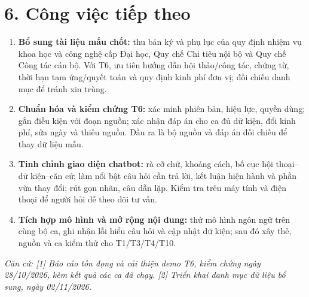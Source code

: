 \documentclass[12pt,a4paper]{article}
\begin{document}
\section*{6. Công việc tiếp theo}
\begin{enumerate}
\item \textbf{Bổ sung tài liệu mấu chốt:} thu bản ký và phụ lục của quy định nhiệm vụ khoa học và công nghệ cấp Đại học, Quy chế Chi tiêu nội bộ và Quy chế Công tác cán bộ. Với T6, ưu tiên hướng dẫn hội thảo/công tác, chứng từ, thời hạn tạm ứng/quyết toán và quy định kinh phí đơn vị; đối chiếu danh mục để tránh xin trùng.
\item \textbf{Chuẩn hóa và kiểm chứng T6:} xác minh phiên bản, hiệu lực, quyền dùng; gắn điều kiện với đoạn nguồn; xác nhận đáp án cho ca đủ dữ kiện, đổi kinh phí, sửa ngày và thiếu nguồn. Đầu ra là bộ nguồn và đáp án đối chiếu để thay dữ liệu mẫu.
\item \textbf{Tinh chỉnh giao diện chatbot:} rà cỡ chữ, khoảng cách, bố cục hội thoại--dữ kiện--căn cứ; làm nổi bật câu hỏi cần trả lời, kết luận hiện hành và phần vừa thay đổi; rút gọn nhãn, câu dẫn lặp. Kiểm tra trên máy tính và điện thoại để người hỏi dễ theo dõi tư vấn.
\item \textbf{Tích hợp mô hình và mở rộng nội dung:} thử mô hình ngôn ngữ trên cùng bộ ca, ghi nhận lỗi hiểu câu hỏi và cập nhật dữ kiện; sau đó xây thẻ, nguồn và ca kiểm thử cho T1/T3/T4/T10.
\end{enumerate}

{\footnotesize\textit{Căn cứ: [1] Báo cáo tồn đọng và cải thiện demo T6, kiểm chứng ngày 28/10/2026, kèm kết quả các ca đã chạy. [2] Triển khai danh mục dữ liệu bổ sung, ngày 02/11/2026.}}
\end{document}
